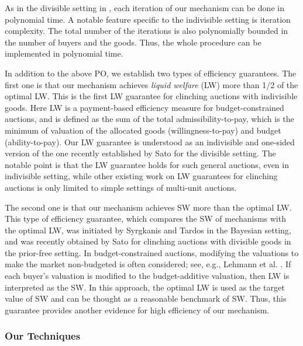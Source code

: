 \documentclass[letterpaper,11pt]{article}
\begin{document}
As in the divisible setting in \cite{GMP2015}, each iteration of our mechanism can be done in polynomial time. 
A notable feature specific to the indivisible setting is iteration complexity. The total number of the iterations is also polynomially bounded in the number of buyers and the goods. 
Thus, the whole procedure can be implemented in polynomial time. 

In addition to the above PO, we establish two types of efficiency guarantees.
The first one is that 
our mechanism achieves {\it liquid welfare} (LW) more than 1/2 of the optimal LW.
This is the first LW guarantee for clinching auctions with indivisible goods. Here LW \cite{DL2014, ST2013} is a payment-based efficiency measure for budget-constrained auctions, and is defined as the sum of the total admissibility-to-pay, which is the minimum of valuation of the allocated goods (willingness-to-pay) and budget (ability-to-pay). 
Our LW guarantee is understood as an indivisible and one-sided version of the one recently established by Sato \cite{S2023} for the divisible setting. The notable point is that the LW guarantee 
holds for such general auctions, even in indivisible setting, while other existing work \cite{DL2014} on 
LW guarantees for clinching auctions is only limited to simple settings of multi-unit auctions. 

The second one is that our mechanism achieves SW more than the optimal LW.
This type of efficiency guarantee, which compares the SW of mechanisms with the optimal LW, was initiated by Syrgkanis and Tardos \cite{ST2013} in the Bayesian setting, and was recently obtained by Sato \cite{S2023} for clinching auctions with divisible goods in the prior-free setting.
In budget-constrained auctions, modifying the valuations to make 
the market non-budgeted is often considered; see, e.g., Lehmann et al. \cite{LLN2006}. 
If each buyer's valuation is modified to the budget-additive valuation, 
then LW is interpreted as the SW. In this approach, the optimal LW is used as the target value of SW 
and can be thought as a reasonable benchmark of SW. 
Thus, this guarantee provides another evidence for high efficiency of our mechanism.


\subsubsection*{Our Techniques}
\begin{comment}
{\it Tight sets lemma} is a powerful tool for efficiency guarantees of polyhedral clinching auctions, 
which characterizes the dropping of buyers and the final allocation.  
We establish the first tight sets lemma for the indivisible settings. In Goel et al. \cite{GMP2015}, which deals with our divisible version, this lemma is obtained by exploiting the simple structure of their mechanism. However, the structure of our mechanism is more complicated due to the indivisibility.
To overcome the difficulties, we use the {\it dropping prices} 
and {\it unsaturation} developed by Goel et al. \cite{GMP2014}, who extend the work of \cite{GMP2015} to a different direction from ours. 
\end{comment}
\end{document}
